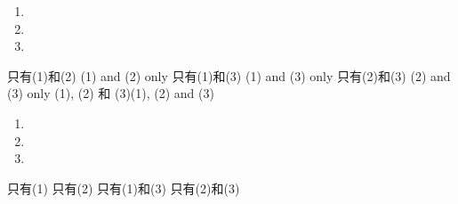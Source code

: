 \question\vspace{1cm}
\begin{samepage}
    \begin{enumerate}[label=\sd]
        \item
              \par
        \item
              \par
        \item
              \par
    \end{enumerate}
\end{samepage}
\begin{samepage}
    \begin{choices}
        \choice 只有(1)和(2) \tab (1) and (2) only
        \choice 只有(1)和(3) \tab (1) and (3) only
        \choice 只有(2)和(3) \tab (2) and (3) only
        \choice (1), (2) 和 (3)\tab (1), (2) and (3)
    \end{choices}
\end{samepage}

\question\vspace{1cm}
\begin{schoices}
    \choice
    \choice
    \choice
\end{schoices}
\begin{mchoices}
    \choice
    \choice
    \choice
    \item
\end{mchoices}

\question\vspace{1cm}
\begin{samepage}
    \begin{enumerate}[label=\sd]
        \item
              \par
        \item
              \par
        \item
              \par
    \end{enumerate}
\end{samepage}
\begin{samepage}
    \begin{choices}
        \choice 只有(1)
        \choice 只有(2)
        \choice 只有(1)和(3)
        \choice 只有(2)和(3)
    \end{choices}
\end{samepage}

\begin{samepage}
    \question\vspace{1cm}

    \begin{choices}
        \choice
        \choice
        \choice
        \choice
    \end{choices}
\end{samepage}



